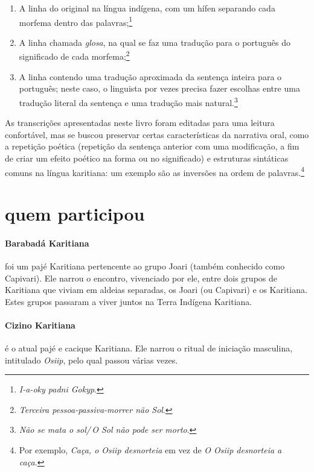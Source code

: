 \begin{enumerate}
\item A linha do original na língua indígena, com um hífen
separando cada morfema dentro das palavras;\footnote{\textit{I-a-oky padni Gokyp}.}

\item A linha chamada
\textit{glosa}, na qual se faz uma tradução para o português do
significado de cada morfema;\footnote{\textit{Terceira pessoa-passiva-morrer não Sol}.}

\item A linha contendo uma tradução
aproximada da sentença inteira para o português; neste caso, o linguista
por vezes precisa fazer escolhas entre uma tradução literal da sentença
e uma tradução mais natural.\footnote{\textit{Não se mata o sol/\,O Sol não pode ser morto}.}

\end{enumerate}

As transcrições apresentadas neste livro foram editadas para uma leitura
confortável, mas se buscou preservar certas características da narrativa
oral, como a repetição poética (repetição da sentença anterior com uma
modificação, a fim de criar um efeito poético na forma ou no
significado) e estruturas sintáticas comuns na língua karitiana: um
exemplo são as inversões na ordem de palavras.\footnote{Por exemplo, \textit{Caça, o
Osiip desnorteia} em vez de \textit{O Osiip desnorteia a caça.}}

\section{quem participou}

\paragraph{Barabadá Karitiana} foi um pajé Karitiana pertencente ao grupo Joari
 (também conhecido como Capivari). Ele narrou o encontro, vivenciado por
 ele, entre dois grupos de Karitiana que viviam em aldeias separadas, os
 Joari (ou Capivari) e os Karitiana. Estes grupos passaram a viver juntos
 na Terra Indígena Karitiana.

 \paragraph{Cizino Karitiana} é o atual pajé e cacique Karitiana. Ele narrou o ritual
 de iniciação masculina, intitulado \textit{Osiip}, pelo qual passou várias
 vezes.

